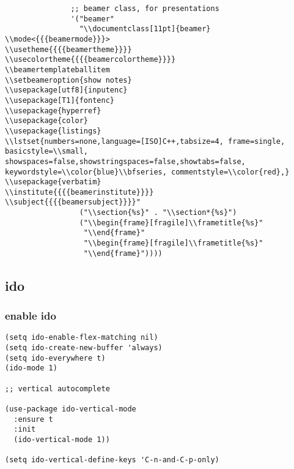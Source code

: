 \documentclass[11pt]{article}
\begin{document}
\begin{enumerate}
\begin{verbatim}
               ;; beamer class, for presentations
               '("beamer"
                 "\\documentclass[11pt]{beamer}
\\mode<{{{beamermode}}}>
\\usetheme{{{{beamertheme}}}}
\\usecolortheme{{{{beamercolortheme}}}}
\\beamertemplateballitem
\\setbeameroption{show notes}
\\usepackage[utf8]{inputenc}
\\usepackage[T1]{fontenc}
\\usepackage{hyperref}
\\usepackage{color}
\\usepackage{listings}
\\lstset{numbers=none,language=[ISO]C++,tabsize=4, frame=single, basicstyle=\\small, showspaces=false,showstringspaces=false,showtabs=false, keywordstyle=\\color{blue}\\bfseries, commentstyle=\\color{red},}
\\usepackage{verbatim}
\\institute{{{{beamerinstitute}}}}          
\\subject{{{{beamersubject}}}}"
                 ("\\section{%s}" . "\\section*{%s}")
                 ("\\begin{frame}[fragile]\\frametitle{%s}"
                  "\\end{frame}"
                  "\\begin{frame}[fragile]\\frametitle{%s}"
                  "\\end{frame}"))))
\end{verbatim}
\end{enumerate}
\subsection{ido}
\label{sec:org14f38b0}
\subsubsection{enable ido}
\label{sec:org38a4ee6}
\begin{verbatim}
(setq ido-enable-flex-matching nil)
(setq ido-create-new-buffer 'always)
(setq ido-everywhere t)
(ido-mode 1)

;; vertical autocomplete

(use-package ido-vertical-mode
  :ensure t
  :init
  (ido-vertical-mode 1))

(setq ido-vertical-define-keys 'C-n-and-C-p-only)
\end{verbatim}
\end{document}
